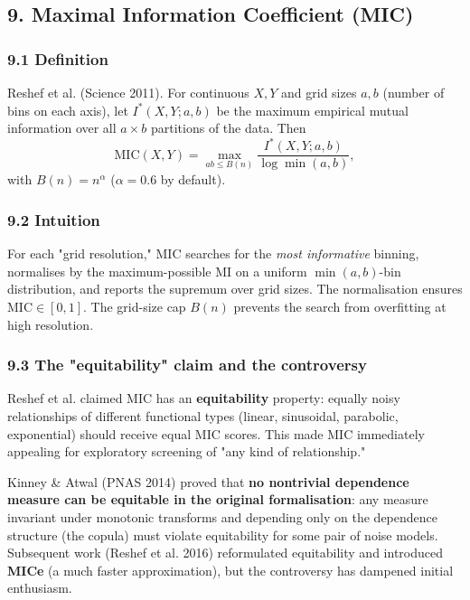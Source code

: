 \documentclass{article}
\begin{document}
\subsection{9. Maximal Information Coefficient
(MIC)}\label{9-maximal-information-coefficient-mic}

\subsubsection{9.1 Definition}\label{91-definition}

Reshef et al. (Science 2011). For continuous \(X, Y\) and grid sizes
\(a, b\) (number of bins on each axis), let \(I^*(X, Y; a, b)\) be the
maximum empirical mutual information over all \(a \times b\) partitions
of the data. Then \[
\mathrm{MIC}(X, Y) = \max_{ab \leq B(n)} \frac{I^*(X, Y; a, b)}{\log \min(a, b)},
\] with \(B(n) = n^{\alpha}\) (\(\alpha = 0.6\) by default).

\subsubsection{9.2 Intuition}\label{92-intuition}

For each "grid resolution," MIC searches for the \emph{most informative}
binning, normalises by the maximum-possible MI on a uniform
\(\min(a, b)\)-bin distribution, and reports the supremum over grid
sizes. The normalisation ensures \(\mathrm{MIC} \in [0, 1]\). The
grid-size cap \(B(n)\) prevents the search from overfitting at high
resolution.

\subsubsection{9.3 The "equitability" claim and the
controversy}\label{93-the-equitability-claim-and-the-controversy}

Reshef et al. claimed MIC has an \textbf{equitability} property: equally
noisy relationships of different functional types (linear, sinusoidal,
parabolic, exponential) should receive equal MIC scores. This made MIC
immediately appealing for exploratory screening of "any kind of
relationship."

Kinney \& Atwal (PNAS 2014) proved that \textbf{no nontrivial dependence
measure can be equitable in the original formalisation}: any measure
invariant under monotonic transforms and depending only on the
dependence structure (the copula) must violate equitability for some
pair of noise models. Subsequent work (Reshef et al. 2016) reformulated
equitability and introduced \textbf{MICe} (a much faster approximation),
but the controversy has dampened initial enthusiasm.
\end{document}
